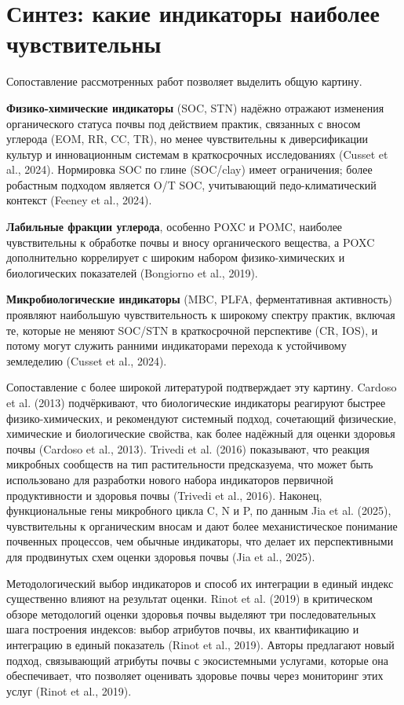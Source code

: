 \documentclass[11pt,a4paper]{article}
\begin{document}
\section{Синтез: какие индикаторы наиболее чувствительны}
\label{sec:synthesis}

Сопоставление рассмотренных работ позволяет выделить общую картину.

\textbf{Физико-химические индикаторы} (SOC, STN) надёжно отражают изменения
органического статуса почвы под действием практик, связанных с вносом
углерода (EOM, RR, CC, TR), но менее чувствительны к диверсификации культур и
инновационным системам в краткосрочных исследованиях (Cusset et al., 2024).
Нормировка SOC по глине (SOC/clay) имеет ограничения; более робастным
подходом является O/T SOC, учитывающий педо-климатический контекст
(Feeney et al., 2024).

\textbf{Лабильные фракции углерода}, особенно POXC и POMC, наиболее
чувствительны к обработке почвы и вносу органического вещества, а POXC
дополнительно коррелирует с широким набором физико-химических и биологических
показателей (Bongiorno et al., 2019).

\textbf{Микробиологические индикаторы} (MBC, PLFA, ферментативная активность)
проявляют наибольшую чувствительность к широкому спектру практик, включая
те, которые не меняют SOC/STN в краткосрочной перспективе (CR, IOS), и потому
могут служить ранними индикаторами перехода к устойчивому земледелию
(Cusset et al., 2024).

Сопоставление с более широкой литературой подтверждает эту картину. Cardoso
et al. (2013) подчёркивают, что биологические индикаторы реагируют быстрее
физико-химических, и рекомендуют системный подход, сочетающий физические,
химические и биологические свойства, как более надёжный для оценки здоровья
почвы (Cardoso et al., 2013). Trivedi et al. (2016) показывают, что
реакция микробных сообществ на тип растительности предсказуема, что может
быть использовано для разработки нового набора индикаторов первичной
продуктивности и здоровья почвы (Trivedi et al., 2016). Наконец,
функциональные гены микробного цикла C, N и P, по данным Jia et al. (2025),
чувствительны к органическим вносам и дают более механистическое понимание
почвенных процессов, чем обычные индикаторы, что делает их перспективными
для продвинутых схем оценки здоровья почвы (Jia et al., 2025).

Методологический выбор индикаторов и способ их интеграции в единый индекс
существенно влияют на результат оценки. Rinot et al. (2019) в критическом
обзоре методологий оценки здоровья почвы выделяют три последовательных шага
построения индексов: выбор атрибутов почвы, их квантификацию и интеграцию в
единый показатель (Rinot et al., 2019). Авторы предлагают новый подход,
связывающий атрибуты почвы с экосистемными услугами, которые она обеспечивает,
что позволяет оценивать здоровье почвы через мониторинг этих услуг
(Rinot et al., 2019).
\end{document}
